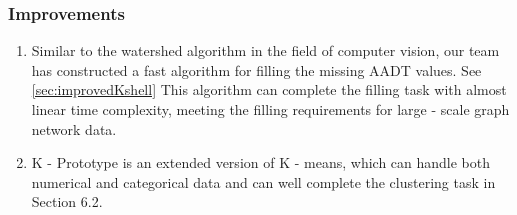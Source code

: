 \documentclass[12pt, a4paper, oneside]{ctexart}
\begin{document}
\subsubsection{Improvements}
\begin{enumerate}
    \item Similar to the watershed algorithm in the field of computer vision\cite{Vincent1991}, our team has constructed a fast algorithm for filling the missing AADT values. See \ref{sec:improvedKshell} This algorithm can complete the filling task with almost linear time complexity, meeting the filling requirements for large - scale graph network data.
    \item K - Prototype is an extended version of K - means, which can handle both numerical and categorical data and can well complete the clustering task in Section 6.2.
\end{enumerate}







\end{document}
